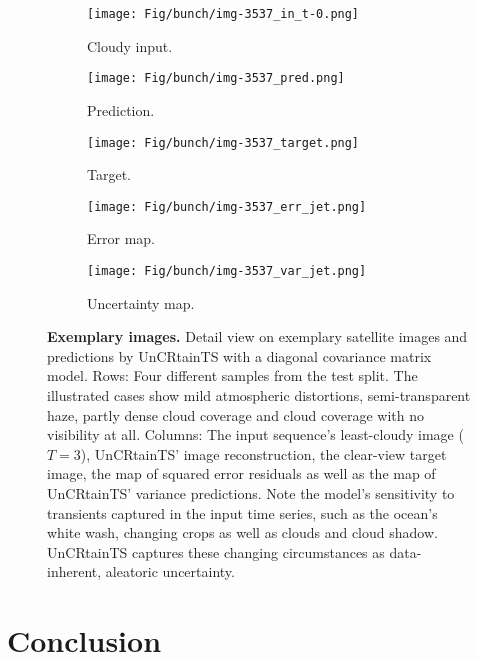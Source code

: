 \documentclass[10pt,twocolumn,letterpaper]{article}
\let\oldtextbf\textbf
\renewcommand{\textbf}[1]{\oldtextbf{\boldmath #1}}
\begin{document}
\begin{figure*}[!htb]
  \begin{subfigure}[b]{0.17\linewidth}
    \texttt{[image: Fig/bunch/img-3537\_in\_t-0.png]}
    \caption{Cloudy input.}
  \end{subfigure}
  \begin{subfigure}[b]{0.17\linewidth}
    \texttt{[image: Fig/bunch/img-3537\_pred.png]}
    \caption{Prediction.}
  \end{subfigure}
  \begin{subfigure}[b]{0.17\linewidth}
    \texttt{[image: Fig/bunch/img-3537\_target.png]}
    \caption{Target.}
  \end{subfigure}
  \begin{subfigure}[b]{0.17\linewidth}
    \texttt{[image: Fig/bunch/img-3537\_err\_jet.png]}
    \caption{Error map.}
  \end{subfigure}   
  \begin{subfigure}[b]{0.17\linewidth}
    \texttt{[image: Fig/bunch/img-3537\_var\_jet.png]}
    \caption{Uncertainty map.}
  \end{subfigure}
  
  \caption{\textbf{Exemplary images.} Detail view on exemplary satellite images and predictions by UnCRtainTS with a diagonal covariance matrix model. Rows: Four different samples from the test split. The illustrated cases show mild atmospheric distortions, semi-transparent haze, partly dense cloud coverage and cloud coverage with no visibility at all. Columns: The input sequence's least-cloudy image ($T=3$), UnCRtainTS' image reconstruction, the clear-view target image, the map of squared error residuals as well as the map of UnCRtainTS' variance predictions. Note the model's sensitivity to transients captured in the input time series, such as the ocean's white wash, changing crops as well as clouds and cloud shadow. UnCRtainTS captures these changing circumstances as data-inherent, aleatoric uncertainty. 
  }
  \label{fig:bunch_of_plots}
\end{figure*}

\section{Conclusion}
\end{document}
